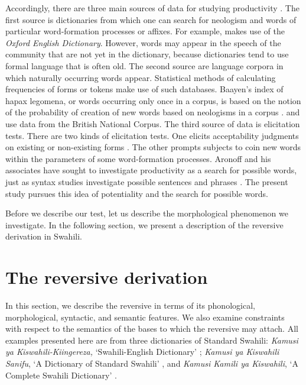 \documentclass[output=paper]{langsci/langscibook}
\begin{document}
Accordingly, there are three main sources of data for studying productivity \citep{Plag2006,SchroederMuehleisen2010,Bolozky1999}. The first source is dictionaries from which one can search for neologism and words of particular word-formation processes or affixes. For example, \citet{Fernandez-Dominguez2013} makes use of the \textit{Oxford English Dictionary}. However, words may appear in the speech of the community that are not yet in the dictionary, because dictionaries tend to use formal language that is often old. The second source are language corpora in which naturally occurring words appear. Statistical methods of calculating frequencies of forms or tokens make use of such databases. Baayen’s index of hapax legomena, or words occurring only once in a corpus, is based on the notion of the probability of creation of new words based on neologisms in a corpus \citep{Baayen1992}. \citet{Plag2006} and \citet{Fernandez-Dominguez2013} use data from the British National Corpus. The third source of data is elicitation tests. There are two kinds of elicitation tests. One elicits acceptability judgments on existing or non-existing forms \citep{AronoffSchvaneveldt1978}. The other prompts subjects to coin new words within the parameters of some word-formation processes. Aronoff and his associates have sought to investigate productivity as a search for possible words, just as syntax studies investigate possible sentences and phrases \citep{Aronoff1976}. The present study pursues this idea of potentiality and the search for possible words.

Before we describe our test, let us describe the morphological phenomenon we investigate. In the following section, we present a description of the reversive derivation in Swahili. 

\section{The reversive derivation} \label{sec:ngonyaningowa:3}

In this section, we describe the reversive in terms of its phonological, morphological, syntactic, and semantic features. We also examine constraints with respect to the semantics of the bases to which the reversive may attach. All examples presented here are from three dictionaries of Standard Swahili: \textit{Kamusi ya Kiswahili-Kiingereza,} ‘Swahili-English Dictionary’ \citep{TUKI2001}; \textit{Kamusi ya Kiswahili Sanifu}, ‘A Dictionary of Standard Swahili’ \citep{TUKI2004}, and \textit{Kamusi Kamili ya Kiswahili}, ‘A Complete Swahili Dictionary’ \citep{Mdeeetal2009}.
\end{document}
